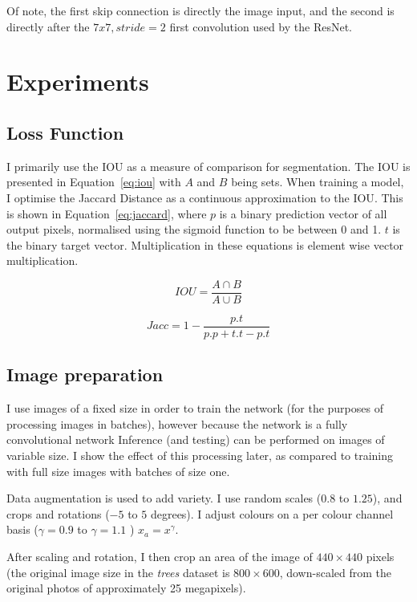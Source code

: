 Of note, the first skip connection is directly the image input, and the second is directly after the $7x7, stride=2$ first convolution used by the ResNet.


\section {Experiments}


\subsection {Loss Function}


I primarily use the \gls{IOU} as a measure of comparison for segmentation. The \gls{IOU} is presented in Equation~\ref{eq:iou} with $ A $ and $ B $ being sets. When training a model, I optimise the Jaccard Distance as a continuous approximation to the \gls{IOU}. This is shown in Equation~\ref{eq:jaccard}, where $ p $ is a binary prediction vector of all output pixels, normalised using the sigmoid function to be between 0 and 1. $ t $ is the binary target vector. Multiplication in these equations is element wise vector multiplication.


\begin{equation}
IOU = \frac{A \cap B}{A \cup B}
\label{eq:iou}
\end{equation}


\begin{equation}
Jacc = 1 - \frac{p.t}{p.p + t.t - p.t}
\label{eq:jaccard}
\end{equation}



\subsection {Image preparation}

I use images of a fixed size in order to train the network (for the purposes of processing images in batches), however because the network is a fully convolutional network Inference (and testing) can be performed on images of variable size. I show the effect of this processing later, as compared to training with full size images with batches of size one.

Data augmentation is used to add variety. I use random scales ($0.8$ to $1.25$), and crops and rotations ($-5$ to $5$ degrees). I adjust colours on a per colour channel basis ($ \gamma = 0.9 $ to $ \gamma=1.1 $ )  $ x_a = x^{\gamma} $.

After scaling and rotation, I then crop an area of the image of $440 \times 440$ pixels (the original image size in the \emph{trees} dataset is $800 \times 600$, down-scaled from the original photos of approximately 25 megapixels).


